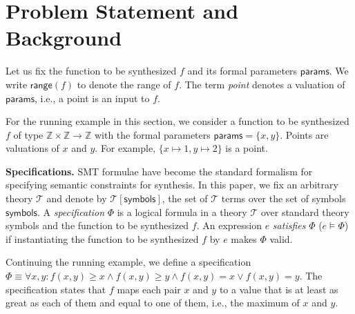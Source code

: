 \documentclass{llncs}
\newcommand\Integers{\mathbb{Z}}
\newcommand\Expr{e}
\newcommand\Spec{\Phi}
\newcommand\SynthFun{f}
\newcommand\range{\mathsf{range}}
\newcommand\FormalParameters{\mathsf{params}}
\newcommand\Symbols{\mathsf{symbols}}
\newcommand\Theory{\mathcal{T}}
\renewcommand{\paragraph}[1]{\par\noindent\textbf{#1.}}
\begin{document}
\section{Problem Statement and Background}
\label{sec:problem}
Let us fix the function to be synthesized $\SynthFun$ and its formal
parameters $\FormalParameters$.
We write $\range(\SynthFun)$ to denote the range of $\SynthFun$.
The term {\em point} denotes a valuation of $\FormalParameters$, i.e., a
point is an input to $\SynthFun$.

\begin{example}
  For the running example in this section, we consider a function to be
  synthesized $\SynthFun$ of type $\Integers \times \Integers \to
  \Integers$ with the formal parameters $\FormalParameters = \{ x, y \}$.
  Points are valuations of $x$ and $y$.
  For example, $\{ x \mapsto 1, y \mapsto 2 \}$ is a point.
\end{example}

\paragraph{Specifications}
SMT formulae have become the standard formalism
for specifying semantic constraints for synthesis.
In this paper, we fix an arbitrary theory $\Theory$ and
denote by $\Theory[\Symbols]$, the set of $\Theory$ terms over the
set of symbols $\Symbols$.
A {\em specification} $\Spec$ is a logical formula in a theory $\Theory$
over standard theory symbols and the function to be synthesized
$\SynthFun$.
An expression $\Expr$ {\em satisfies} $\Spec$ ($\Expr \models \Spec$) if
instantiating the function to be synthesized $\SynthFun$ by $\Expr$
makes $\Spec$ valid.

\begin{example}
  \label{ex:running:spec}
  Continuing the running example, we define a specification $\Spec
  \equiv \forall x, y : \SynthFun(x, y) \geq x \wedge \SynthFun(x, y)
  \geq y \wedge f(x, y) = x \vee f(x, y) = y$.
  The specification states that $\SynthFun$ maps each pair $x$ and $y$
  to a value that is at least as great as each of them and equal to one
  of them, i.e., the maximum of $x$ and $y$.
\end{example}
\end{document}
